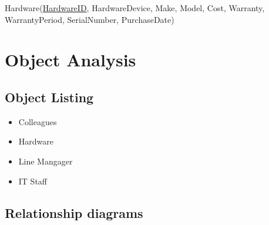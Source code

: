 Hardware(\underline{HardwareID}, HardwareDevice, Make, Model, Cost, Warranty, \\WarrantyPeriod, SerialNumber, PurchaseDate)

\section{Object Analysis}

\subsection{Object Listing}

\begin{itemize}
\item Colleagues
\item Hardware
\item Line Mangager
\item IT Staff
\end{itemize}

\subsection{Relationship diagrams}

